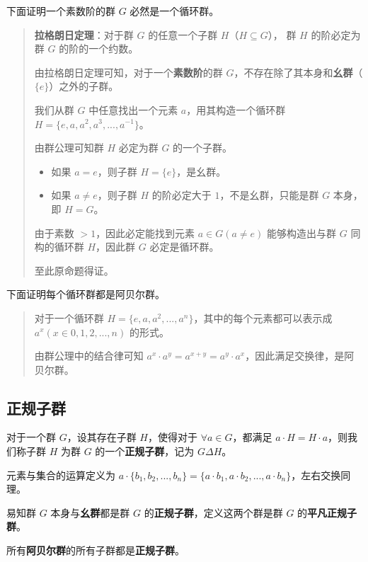\documentclass[hyperref,UTF8,12pt,a4paper]{ctexart}
\begin{document}
下面证明一个素数阶的群 $G$ 必然是一个循环群。

\begin{quote}
\textbf{拉格朗日定理}：对于群 $G$ 的任意一个子群 $H$（$H \subseteq G$）， 群 $H$ 的阶必定为群 $G$ 的阶的一个约数。

由拉格朗日定理可知，对于一个\textbf{素数阶}的群 $G$，不存在除了其本身和\textbf{幺群}（$\{e\}$）之外的子群。

我们从群 $G$ 中任意找出一个元素 $a$，用其构造一个循环群 $H = \{e, a, a^2, a^3, ..., a^{-1}\}$。

由群公理可知群 $H$ 必定为群 $G$ 的一个子群。

\begin{itemize}
\item 如果 $a = e$，则子群 $H=\{e\}$，是幺群。
\item 如果 $a \ne e$，则子群 $H$ 的阶必定大于 $1$，不是幺群，只能是群 $G$ 本身，即 $H=G$。
\end{itemize}

由于素数 $> 1$，因此必定能找到元素 $a \in G (a \ne e)$ 能够构造出与群 $G$ 同构的循环群 $H$，因此群 $G$ 必定是循环群。

至此原命题得证。
\end{quote}

下面证明每个循环群都是阿贝尔群。

\begin{quote}
对于一个循环群 $H=\{e, a, a^2, ..., a^n\}$，其中的每个元素都可以表示成 $a^x(x\in{0,1,2,...,n})$ 的形式。

由群公理中的结合律可知 $a^x \cdot a^y = a^{x+y} = a^y \cdot a^x$，因此满足交换律，是阿贝尔群。
\end{quote}

\subsection{正规子群}

对于一个群 $G$，设其存在子群 $H$，使得对于 $\forall a \in G$，都满足 $a \cdot H = H \cdot a$，则我们称子群 $H$ 为群 $G$ 的一个\textbf{正规子群}，记为 $G \Delta H$。

元素与集合的运算定义为 $a \cdot \{b_1, b_2, ..., b_n\} = \{a \cdot b_1, a \cdot b_2, ..., a \cdot b_n\}$，左右交换同理。

易知群 $G$ 本身与\textbf{幺群}都是群 $G$ 的\textbf{正规子群}，定义这两个群是群 $G$ 的\textbf{平凡正规子群}。

所有\textbf{阿贝尔群}的所有子群都是\textbf{正规子群}。
\end{document}
